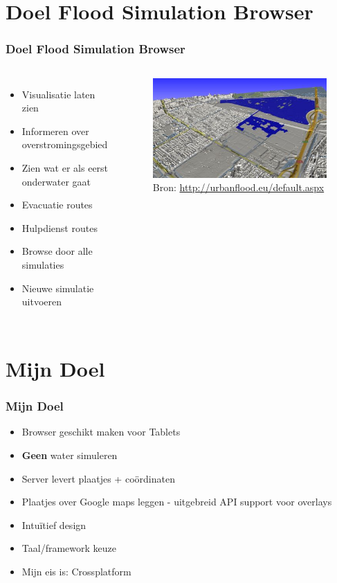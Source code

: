 \documentclass[10pt,a4paper]{beamer}
\begin{document}
\section{Doel Flood Simulation Browser}
\begin{frame}
\frametitle{Doel Flood Simulation Browser}
\begin{columns}[c]
\column{5cm}
\begin{itemize}
\item Visualisatie laten zien
\item Informeren over overstromingsgebied
\item Zien wat er als eerst onderwater gaat
\item Evacuatie routes
\item Hulpdienst routes
\item Browse door alle simulaties
\item Nieuwe simulatie uitvoeren
\end{itemize}
\column{5cm}
\begin{figure}
\includegraphics[scale=0.5]{simulation.png}
\caption{Bron: \url{http://urbanflood.eu/default.aspx}}
\end{figure}
\end{columns}
\end{frame}
\section{Mijn Doel}
\begin{frame}
\frametitle{Mijn Doel}
\begin{itemize}
\item Browser geschikt maken voor Tablets
\item \textbf{Geen} water simuleren
\item Server levert plaatjes + coördinaten
\item Plaatjes over Google maps leggen - uitgebreid API support voor overlays
\item Intuïtief design
\item Taal/framework keuze
\item Mijn eis is: Crossplatform
\end{itemize}
\end{frame}
\end{document}

